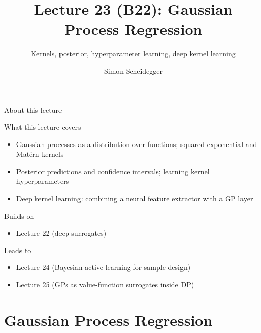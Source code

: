 \documentclass[aspectratio=169,11pt]{beamer}
\title[Lecture 23 (B22)]{Lecture 23 (B22): Gaussian Process Regression}
\subtitle{Kernels, posterior, hyperparameter learning, deep kernel learning}
\author{Simon Scheidegger}
\institute{HEC, University of Lausanne}
\date{}
\begin{document}
\providecommand{\exercisepause}{%
  \tikz[baseline=(X.base)]{\node[fill=darkgreen!80!black, text=white,
  rounded corners=2pt, inner sep=3pt, font=\scriptsize\bfseries](X){PAUSE};}}

{
\begin{frame}
\titlepage
\end{frame}
}

\begin{frame}{About this lecture}
\small
\begin{block}{What this lecture covers}
\begin{itemize}\itemsep2pt
  \item Gaussian processes as a distribution over functions; squared-exponential and Mat\'ern kernels
  \item Posterior predictions and confidence intervals; learning kernel hyperparameters
  \item Deep kernel learning: combining a neural feature extractor with a GP layer
\end{itemize}
\end{block}
\begin{block}{Builds on}
\begin{itemize}\itemsep2pt
  \item Lecture 22 (deep surrogates)
\end{itemize}
\end{block}
\begin{block}{Leads to}
\begin{itemize}\itemsep2pt
  \item Lecture 24 (Bayesian active learning for sample design)
  \item Lecture 25 (GPs as value-function surrogates inside DP)
\end{itemize}
\end{block}
\end{frame}

\section{Gaussian Process Regression}
\end{document}

